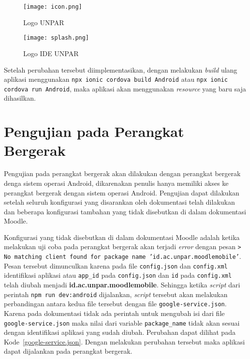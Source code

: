 \begin{figure}[H] 
	\centering  
	\texttt{[image: icon.png]}  
	\caption[Logo  UNPAR] {Logo  UNPAR} 
	\label{app:icon} 
\end{figure} 


\begin{figure}[H] 
	\centering  
	\texttt{[image: splash.png]}  
	\caption[Logo IDE UNPAR] {Logo IDE UNPAR} 
	\label{app:splash} 
\end{figure} 



Setelah perubahan tersebut diimplementasikan, dengan melakukan \textit{build} ulang aplikasi menggunakan \texttt{npx ionic cordova build Android} atau \texttt{npx ionic cordova run Android}, maka aplikasi akan menggunakan \textit{resource} yang baru saja dihasilkan.

\section{Pengujian pada Perangkat Bergerak}
Pengujian pada perangkat bergerak akan dilakukan dengan perangkat bergerak denga sistem operasi Android, dikarenakan penulis hanya memiliki akses ke perangkat bergerak dengan sistem operasi Android. Pengujian dapat dilakukan setelah seluruh konfigurasi yang disarankan oleh dokumentasi telah dilakukan dan beberapa konfigurasi tambahan yang tidak disebutkan di dalam dokumentasi Moodle.

Konfigurasi yang tidak disebutkan di dalam dokumentasi Moodle adalah ketika melakukan uji coba pada perangkat bergerak akan terjadi \textit{error} dengan pesan \texttt{> No matching client found for package name 'id.ac.unpar.moodlemobile'}. Pesan tersebut dimunculkan karena pada file \texttt{config.json} dan \texttt{config.xml} identifikasi aplikasi atau \texttt{app\_id} pada \texttt{config.json} dan \texttt{id} pada \texttt{config.xml} telah diubah menjadi \textbf{id.ac.unpar.moodlemobile}. Sehingga ketika \textit{script} dari perintah \texttt{npm run dev:android} dijalankan, \textit{script} tersebut akan melakukan perbandingan antara kedua file tersebut dengan file \texttt{google-service.json}. Karena pada dokumentasi tidak ada perintah untuk mengubah isi dari file \texttt{google-service.json} maka nilai dari variable \texttt{package\_name} tidak akan sesuai dengan identifikasi aplikasi yang sudah diubah. Perubahan dapat dilihat pada \mbox{Kode \ref{google-service.json}}. Dengan melakukan perubahan tersebut maka aplikasi dapat dijalankan pada perangkat bergerak.

